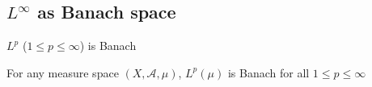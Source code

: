 \documentclass{qlnotes-export}
\begin{document}
\subsection{\texorpdfstring{\(L^{\infty}\) as Banach space}{L\^{}\{\textbackslash infty\} as Banach space}}\label{linfty-as-banach-space}

\begin{theorem}{\(L^{p}\) (\(1 \leq p \leq \infty\)) is Banach}\label{thm-09-l-p-space-and-inequalities-l-p-1-leq-p-leq-infty-is-banach}

For any measure space \((X,\mathcal{A},\mu)\), \(L^{p}(\mu)\) is Banach for all \(1 \leq p \leq \infty\)

\end{theorem}
\end{document}
